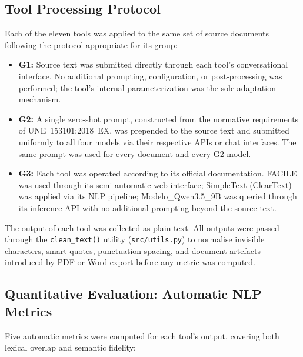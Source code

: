 \documentclass[12pt, a4paper]{article}
\begin{document}
\subsection{Tool Processing Protocol}
\label{ssec:protocol}

Each of the eleven tools was applied to the same set of source documents following the
protocol appropriate for its group:

\begin{itemize}
  \item \textbf{G1:} Source text was submitted directly through each tool's conversational
    interface. No additional prompting, configuration, or post-processing was performed;
    the tool's internal parameterization was the sole adaptation mechanism.
  \item \textbf{G2:} A single zero-shot prompt, constructed from the normative requirements
    of UNE~153101:2018~EX, was prepended to the source text and submitted uniformly to all
    four models via their respective APIs or chat interfaces. The same prompt was used for
    every document and every G2 model.
  \item \textbf{G3:} Each tool was operated according to its official documentation. FACILE
    was used through its semi-automatic web interface; SimpleText (ClearText) was applied
    via its NLP pipeline; Modelo\_Qwen3.5\_9B was queried through its inference API with no
    additional prompting beyond the source text.
\end{itemize}

The output of each tool was collected as plain text. All outputs were passed through the
\texttt{clean\_text()} utility (\texttt{src/utils.py}) to normalise invisible characters,
smart quotes, punctuation spacing, and document artefacts introduced by PDF or Word export
before any metric was computed.

\subsection{Quantitative Evaluation: Automatic NLP Metrics}
\label{ssec:nlp-metrics}

Five automatic metrics were computed for each tool's output, covering both lexical overlap
and semantic fidelity:
\end{document}
